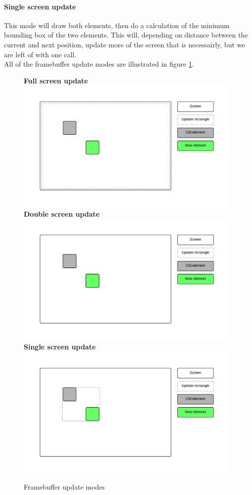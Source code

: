 \paragraph{Single screen update}
This mode will draw both elements, then do a calculation of the minimum bounding box of the two elements. This will, depending on distance between the current and next position, update more of the screen that is necessairly, but we are left of with one  call.\\

All of the framebuffer update modes are illustrated in figure \ref{fig:framebuffer-update-modes}.
\begin{figure}
	\label{fig:framebuffer-update-modes}
	\centering
	\textbf{Full screen update} \\
	\includegraphics[width=11cm]{img/update_entire_screen.png}\\
	\textbf{Double screen update} \\
	\includegraphics[width=11cm]{img/update_twice.png}\\
	\textbf{Single screen update} \\
	\includegraphics[width=11cm]{img/update_once.png}\\
	\caption{Framebuffer update modes}
\end{figure}
\newpage
